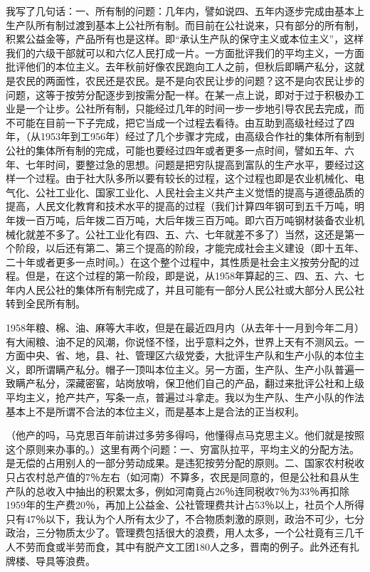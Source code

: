 我写了几句话：一、所有制的问题：几年内，譬如说四、五年内逐步完成由基本上生产队所有制过渡到基本上公社所有制。而目前在公社说来，只有部分的所有制，积累公益金等，产品所有也是这样。即“承认生产队的保守主义或本位主义”，这样我们的六级干部就可以和六亿人民打成一片。一方面批评我们的平均主义，一方面批评他们的本位主义。去年秋前好像农民跑向工人之前，但秋后即瞒产私分，这就是农民的两面性，农民还是农民。是不是向农民让步的问题？这不是向农民让步的问题，这等于按劳分配逐步到按需分配一样。在某一点上说，即对于过于积极办工业是一个让步。公社所有制，只能经过几年的时间一步一步地引导农民去完成，而不可能在目前一下子完成，把它当成一个过程去看待。由互助到高级社经过了四年，（从1953年到工956年）经过了几个步骤才完成，由高级合作社的集体所有制到公社的集体所有制的完成，可能也要经过四年或者更多一点时间，譬如五年、六年、七年时间，要整过急的思想。问题是把穷队提高到富队的生产水平，要经过这样一个过程。由于社大队多所以要有较长的过程，这个过程也即是农业机械化、电气化、公社工业化、国家工业化、人民社会主义共产主义觉悟的提高与道德品质的提高，人民文化教育和技术水平的提高的过程（我们计算四年钢可到五千万吨，明年拨一百万吨，后年拨二百万吨，大后年拨三百万吨。即六百万吨钢材装备农业机械化就差不多了。公社工业化有四、五、六、七年就差不多了）当然，这还是第一个阶段，以后还有第二、第三个提高的阶段，才能完成社会主义建设（即十五年、二十年或者更多一点时间。）在这个整个过程中，其性质是社会主义按劳分配的过程。但是，在这个过程的第一阶段，即是说，从1958年算起的三、四、五、六、七年内人民公社的集体所有制完成了，并且可能有一部分人民公社或大部分人民公社转到全民所有制。

1958年粮、棉、油、麻等大丰收，但是在最近四月内（从去年十一月到今年二月）有大闹粮、油不足的风潮，你说怪不怪，出乎意料之外，世界上天有不测风云。一方面中央、省、地，县、社、管理区六级党委，大批评生产队和生产小队的本位主义，即所谓瞒产私分。帽子一顶叫本位主义。另一方面，生产队、生产小队普遍一致瞒产私分，深藏密窖，站岗放哨，保卫他们自己的产品，翻过来批评公社和上级平均主义，抢产共产，写条一点，普遍过斗拿走。我以为生产队、生产小队的作法基本上不是所谓不合法的本位主义，而是基本上是合法的正当权利。

（他产的吗，马克思百年前讲过多劳多得吗，他懂得点马克思主义。他们就是按照这个原则来办事的。）这里有两个问题：一、穷富队拉平，平均主义的分配方法。是无偿的占用别人的一部分劳动成果。是违犯按劳分配的原则。二、国家农村税收只占农村总产值的7％左右（如河南）不算多，农民是同意的，但是公社和县从生产队的总收入中抽出的积累太多，例如河南竟占26％连同税收7％为33％再扣除1959年的生产费20％，再加上公益金、公社管理费共计占53％以上，社员个人所得只有47％以下，我认为个人所有太少了，不合物质刺激的原则，政治不可少，七分政治，三分物质太少了。管理费包括很大的浪费，用人太多，一个公社竟有三几千人不劳而食或半劳而食，其中有脱产文工团180人之多，晋南的例子。此外还有扎牌楼、导具等浪费。

